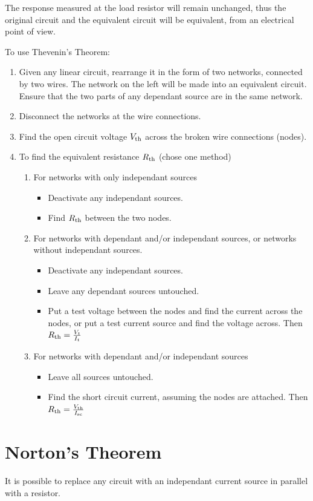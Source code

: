 \documentclass[12pt]{article}
\begin{document}
The response measured at the load resistor will remain unchanged, thus the original circuit and the equivalent circuit will be equivalent, from an electrical point of view.

To use Thevenin's Theorem:
\begin{enumerate}
\item Given any linear circuit, rearrange it in the form of two networks, connected by two wires. The network on the left will be made into an equivalent circuit. Ensure that the two parts of any dependant source are in the same network.
\item Disconnect the networks at the wire connections.
\item Find the open circuit voltage $V_{{\rm th}}$ across the broken wire connections (nodes).
\item To find the equivalent resistance $R_{{\rm th}}$ (chose one method)
\begin{enumerate}
\item For networks with only independant sources
\begin{itemize}
\item Deactivate any independant sources.
\item Find $R_{{\rm th}}$ between the two nodes.
\end{itemize}
\item For networks with dependant and/or independant sources, or networks without independant sources.
\begin{itemize}
\item Deactivate any independant sources.
\item Leave any dependant sources untouched.
\item Put a test voltage between the nodes and find the current across the nodes, or put a test current source and find the voltage across. Then $R_{{\rm th}} = \frac{V_t}{I_t}$
\end{itemize}
\item For networks with dependant and/or independant sources
\begin{itemize}
\item Leave all sources untouched.
\item Find the short circuit current, assuming the nodes are attached. Then $R_{{\rm th}} = \frac{V_{{\rm th}}}{I_{{\rm sc}}}$
\end{itemize}
\end{enumerate}
\end{enumerate}

\section*{Norton's Theorem}
\begin{theorem}
It is possible to replace any circuit with an independant current source in parallel with a resistor.
\end{theorem}
\end{document}
